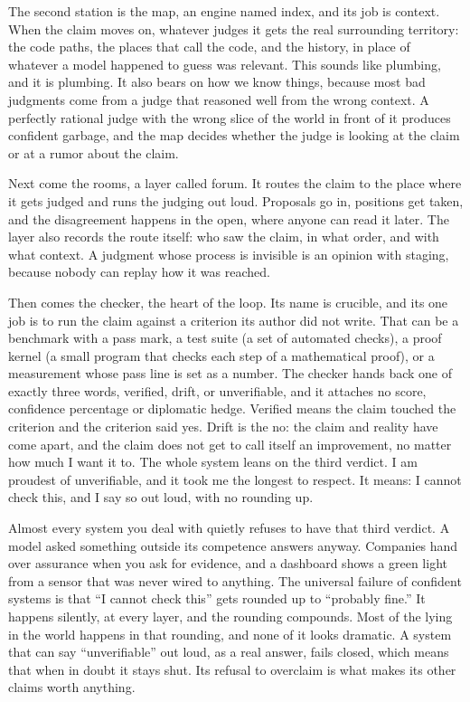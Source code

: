 \documentclass[11pt]{article}
\begin{document}
The second station is the map, an engine named index, and its job is context. When the claim moves on, whatever judges it gets the real surrounding territory: the code paths, the places that call the code, and the history, in place of whatever a model happened to guess was relevant. This sounds like plumbing, and it is plumbing. It also bears on how we know things, because most bad judgments come from a judge that reasoned well from the wrong context. A perfectly rational judge with the wrong slice of the world in front of it produces confident garbage, and the map decides whether the judge is looking at the claim or at a rumor about the claim.

Next come the rooms, a layer called forum. It routes the claim to the place where it gets judged and runs the judging out loud. Proposals go in, positions get taken, and the disagreement happens in the open, where anyone can read it later. The layer also records the route itself: who saw the claim, in what order, and with what context. A judgment whose process is invisible is an opinion with staging, because nobody can replay how it was reached.

Then comes the checker, the heart of the loop. Its name is crucible, and its one job is to run the claim against a criterion its author did not write. That can be a benchmark with a pass mark, a test suite (a set of automated checks), a proof kernel (a small program that checks each step of a mathematical proof), or a measurement whose pass line is set as a number. The checker hands back one of exactly three words, verified, drift, or unverifiable, and it attaches no score, confidence percentage or diplomatic hedge. Verified means the claim touched the criterion and the criterion said yes. Drift is the no: the claim and reality have come apart, and the claim does not get to call itself an improvement, no matter how much I want it to. The whole system leans on the third verdict. I am proudest of unverifiable, and it took me the longest to respect. It means: I cannot check this, and I say so out loud, with no rounding up.

Almost every system you deal with quietly refuses to have that third verdict. A model asked something outside its competence answers anyway. Companies hand over assurance when you ask for evidence, and a dashboard shows a green light from a sensor that was never wired to anything. The universal failure of confident systems is that ``I cannot check this'' gets rounded up to ``probably fine.'' It happens silently, at every layer, and the rounding compounds. Most of the lying in the world happens in that rounding, and none of it looks dramatic. A system that can say ``unverifiable'' out loud, as a real answer, fails closed, which means that when in doubt it stays shut. Its refusal to overclaim is what makes its other claims worth anything.
\end{document}
